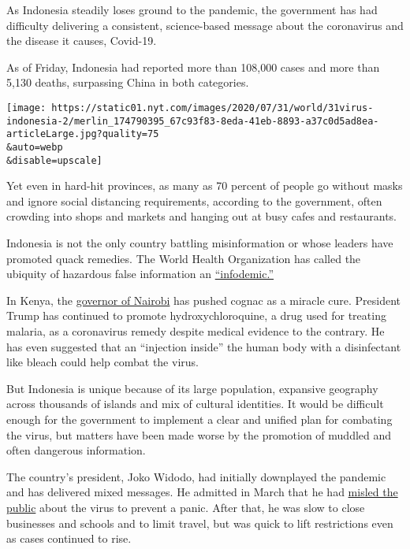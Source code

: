 As Indonesia steadily loses ground to the pandemic, the government has
had difficulty delivering a consistent, science-based message about the
coronavirus and the disease it causes, Covid-19.

As of Friday, Indonesia had reported more than 108,000 cases and more
than 5,130 deaths, surpassing China in both categories.

\texttt{[image: https://static01.nyt.com/images/2020/07/31/world/31virus-indonesia-2/merlin\_174790395\_67c93f83-8eda-41eb-8893-a37c0d5ad8ea-articleLarge.jpg?quality=75\\\&auto=webp\\\&disable=upscale]}

Yet even in hard-hit provinces, as many as 70 percent of people go
without masks and ignore social distancing requirements, according to
the government, often crowding into shops and markets and hanging out at
busy cafes and restaurants.

Indonesia is not the only country battling misinformation or whose
leaders have promoted quack remedies. The World Health Organization has
called the ubiquity of hazardous false information an
\href{https://www.nytimes.com/2020/02/06/health/coronavirus-misinformation-social-media.html}{``infodemic.''}

In Kenya, the
\href{https://www.nytimes.com/2020/04/17/world/coronavirus-news-updates.html\#link-5699a22e}{governor
of Nairobi} has pushed cognac as a miracle cure. President Trump has
continued to promote hydroxychloroquine, a drug used for treating
malaria, as a coronavirus remedy despite medical evidence to the
contrary. He has even suggested that an ``injection inside'' the human
body with a disinfectant like bleach could help combat the virus.

But Indonesia is unique because of its large population, expansive
geography across thousands of islands and mix of cultural identities. It
would be difficult enough for the government to implement a clear and
unified plan for combating the virus, but matters have been made worse
by the promotion of muddled and often dangerous information.

The country's president, Joko Widodo, had initially downplayed the
pandemic and has delivered mixed messages. He admitted in March that he
had
\href{https://www.nytimes.com/2020/03/17/world/asia/coronavirus-southeast-asia.html}{misled
the public} about the virus to prevent a panic. After that, he was slow
to close businesses and schools and to limit travel, but was quick to
lift restrictions even as cases continued to rise.

